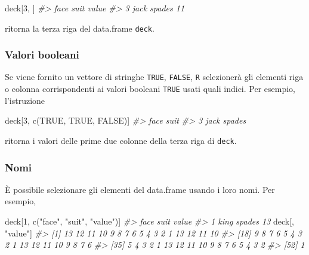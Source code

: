 \documentclass[
  11pt,
]{krantz}
\makeatletter
\newenvironment{Shaded}{\begin{snugshade}}{\end{snugshade}}
\newcommand{\CommentTok}[1]{\textcolor[rgb]{0.37,0.37,0.37}{\textit{#1}}}
\newcommand{\ConstantTok}[1]{\textcolor[rgb]{0,0,0}{#1}}
\newcommand{\DecValTok}[1]{\textcolor[rgb]{0.06,0.06,0.06}{#1}}
\newcommand{\FunctionTok}[1]{\textcolor[rgb]{0,0,0}{#1}}
\newcommand{\NormalTok}[1]{#1}
\newcommand{\StringTok}[1]{\textcolor[rgb]{0.5,0.5,0.5}{#1}}
\newenvironment{kframe}{%
\medskip{}
\setlength{\fboxsep}{.8em}
 \def\at@end@of@kframe{}%
 \ifinner\ifhmode%
  \def\at@end@of@kframe{\end{minipage}}%
  \begin{minipage}{\columnwidth}%
 \fi\fi%
 \def\FrameCommand##1{\hskip\@totalleftmargin \hskip-\fboxsep
 \colorbox{shadecolor}{##1}\hskip-\fboxsep
     \hskip-\linewidth \hskip-\@totalleftmargin \hskip\columnwidth}%
 \MakeFramed {\advance\hsize-\width
   \@totalleftmargin\z@ \linewidth\hsize
   \@setminipage}}%
 {\par\unskip\endMakeFramed%
 \at@end@of@kframe}
\renewenvironment{Shaded}{\begin{kframe}}{\end{kframe}}
\theoremstyle{definition}
\theoremstyle{definition}
\theoremstyle{definition}
\theoremstyle{definition}
\theoremstyle{remark}
\makeatother
\begin{document}
\begin{Shaded}
\begin{Highlighting}[]
\NormalTok{deck[}\DecValTok{3}\NormalTok{, ]}
\CommentTok{\#\textgreater{}   face   suit value}
\CommentTok{\#\textgreater{} 3 jack spades    11}
\end{Highlighting}
\end{Shaded}

ritorna la terza riga del data.frame \texttt{deck}.

\hypertarget{valori-booleani}{%
\subsubsection{Valori booleani}\label{valori-booleani}}

Se viene fornito un vettore di stringhe \texttt{TRUE}, \texttt{FALSE}, \texttt{R} selezionerà gli elementi riga o colonna corrispondenti ai valori booleani \texttt{TRUE} usati quali indici. Per esempio, l'istruzione

\begin{Shaded}
\begin{Highlighting}[]
\NormalTok{deck[}\DecValTok{3}\NormalTok{, }\FunctionTok{c}\NormalTok{(}\ConstantTok{TRUE}\NormalTok{, }\ConstantTok{TRUE}\NormalTok{, }\ConstantTok{FALSE}\NormalTok{)]}
\CommentTok{\#\textgreater{}   face   suit}
\CommentTok{\#\textgreater{} 3 jack spades}
\end{Highlighting}
\end{Shaded}

ritorna i valori delle prime due colonne della terza riga di \texttt{deck}.

\hypertarget{nomi}{%
\subsubsection{Nomi}\label{nomi}}

È possibile selezionare gli elementi del data.frame usando i loro nomi. Per esempio,

\begin{Shaded}
\begin{Highlighting}[]
\NormalTok{deck[}\DecValTok{1}\NormalTok{, }\FunctionTok{c}\NormalTok{(}\StringTok{"face"}\NormalTok{, }\StringTok{"suit"}\NormalTok{, }\StringTok{"value"}\NormalTok{)]}
\CommentTok{\#\textgreater{}   face   suit value}
\CommentTok{\#\textgreater{} 1 king spades    13}
\NormalTok{deck[, }\StringTok{"value"}\NormalTok{]}
\CommentTok{\#\textgreater{}  [1] 13 12 11 10  9  8  7  6  5  4  3  2  1 13 12 11 10}
\CommentTok{\#\textgreater{} [18]  9  8  7  6  5  4  3  2  1 13 12 11 10  9  8  7  6}
\CommentTok{\#\textgreater{} [35]  5  4  3  2  1 13 12 11 10  9  8  7  6  5  4  3  2}
\CommentTok{\#\textgreater{} [52]  1}
\end{Highlighting}
\end{Shaded}
\end{document}
